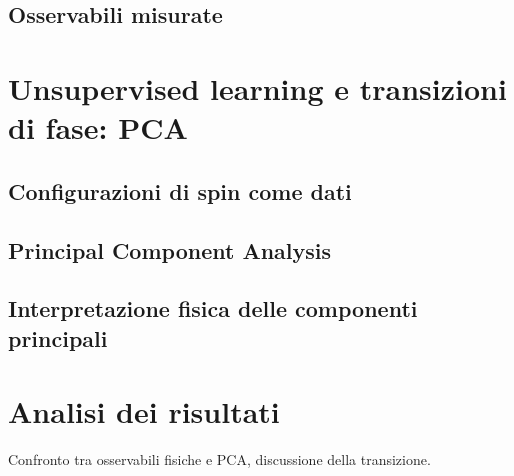 \subsection{Osservabili misurate}

\section{Unsupervised learning e transizioni di fase: PCA}
\subsection{Configurazioni di spin come dati}
\subsection{Principal Component Analysis}
\subsection{Interpretazione fisica delle componenti principali}

\section{Analisi dei risultati}
Confronto tra osservabili fisiche e PCA, discussione della transizione.


